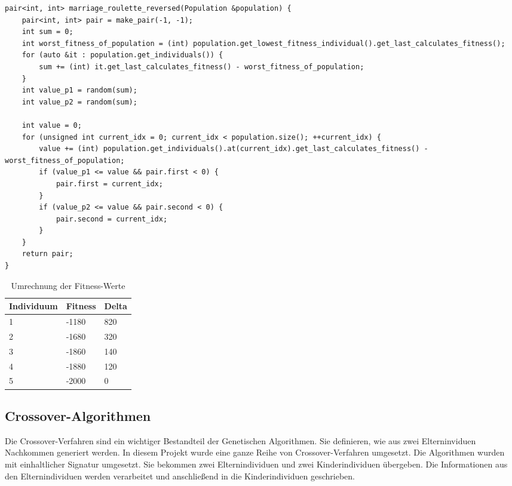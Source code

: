 \begin{minipage}{\linewidth}
\begin{lstlisting}[caption={Marriage-Roulette Algorithmus}, firstnumber=1, captionpos=b, label=lst:marriage]
pair<int, int> marriage_roulette_reversed(Population &population) {
	pair<int, int> pair = make_pair(-1, -1);
	int sum = 0;
	int worst_fitness_of_population = (int) population.get_lowest_fitness_individual().get_last_calculates_fitness();
	for (auto &it : population.get_individuals()) {
		sum += (int) it.get_last_calculates_fitness() - worst_fitness_of_population;
	}
	int value_p1 = random(sum);
	int value_p2 = random(sum);

	int value = 0;
	for (unsigned int current_idx = 0; current_idx < population.size(); ++current_idx) {
		value += (int) population.get_individuals().at(current_idx).get_last_calculates_fitness() - worst_fitness_of_population;
		if (value_p1 <= value && pair.first < 0) {
			pair.first = current_idx;
		}
		if (value_p2 <= value && pair.second < 0) {
			pair.second = current_idx;
		}
	}
	return pair;
}
\end{lstlisting}
\end{minipage}
\begin{table}[H]
\center
\caption{Umrechnung der Fitness-Werte}
\begin{tabular}{|l|l|l|}
 Individuum & Fitness & Delta \\ 
\hline
 1 & -1180 & 820 \\  
 2 & -1680 & 320 \\  
 3 & -1860 & 140 \\  
 4 & -1880 & 120 \\  
 5 & -2000 & 0 \\  
\end{tabular}
\label{tab:roulette}
\end{table}

\subsection{Crossover-Algorithmen}
Die Crossover-Verfahren sind ein wichtiger Bestandteil der Genetischen Algorithmen. Sie definieren, wie aus zwei Elterninviduen Nachkommen generiert werden.
In diesem Projekt wurde eine ganze Reihe von Crossover-Verfahren umgesetzt. Die Algorithmen wurden mit einhaltlicher Signatur umgesetzt. Sie bekommen zwei Elternindividuen und zwei Kinderindividuen übergeben.
Die Informationen aus den Elternindividuen werden verarbeitet und anschließend in die Kinderindividuen geschrieben.

